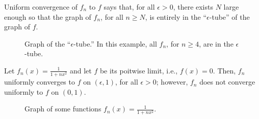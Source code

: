 
Uniform convergence of \(f_n\) to \(f\) says that, for all \(\epsilon > 0\), there exists \(N\) large enough so that the graph of \(f_n\), for all \(n \geq N\), is entirely in the ``\(\epsilon\)-tube'' of the graph of \(f\).

\begin{figure}[htbp]
  \centering
  \caption{Graph of the ``\(\epsilon\)-tube.'' In this example, all \(f_n\), for \(n \geq 4\), are in the  \(\epsilon\)-tube.}
\end{figure}

\begin{exmp}{}{}
  Let \(f_n(x) = \frac{1}{1+nx^2}\) and let \(f\) be its poitwise limit, i.e., \(f(x) = 0\). Then, \(f_n\) uniformly converges to \(f\) on \((\epsilon, 1)\), for all \(\epsilon > 0\); however, \(f_n\) does not converge uniformly to \(f\) on \((0, 1)\).
\end{exmp}

\begin{figure}[htbp]
  \centering
  \caption{Graph of some functions \(f_n(x) = \frac{1}{1 + nx^2}\).}
\end{figure}
